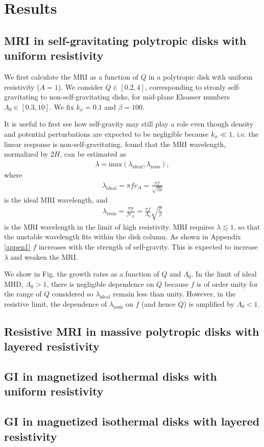 \section{Results}

\subsection{MRI in self-gravitating polytropic disks with uniform
  resistivity}  
We first calculate the MRI as a function of $Q$ in a polytropic disk
with uniform resistivity ($A=1$). We consider $Q\in[0.2,4]$,
corresponding to stronly self-gravitating to non-self-gravitating
disks, for mid-plane Elsasser numbers $\Lambda_0\in[0.3,10]$. We fix $k_x=0.1$ and 
$\beta=100$. 

It is useful to first see how self-gravity may still play a role even
though density and potential perturbations are expected to be
negligible because $k_x\ll1$, i.e. the linear response is
non-self-gravitating. 
\cite{sano99} found that the MRI wavelength, normalized by $2H$, can be estimated as
\begin{align}
  \lambda=\mathrm{max}\left(\lambda_\mathrm{ideal},\lambda_\mathrm{resis}\right), 
\end{align}
where
\begin{align}
  \lambda_\mathrm{ideal} = \pi f v_A = \frac{\pi f}{\sqrt{\beta\rho}} 
\end{align}
is the ideal MRI wavelength, and 
\begin{align}
  \lambda_\mathrm{resis} =\frac{\pi\eta}{f v_A}=\frac{\pi f}{\Lambda_0}\sqrt{\frac{\rho}{\beta}}
\end{align}
is the MRI wavelength in the limit of high resistivity. MRI requires
$\lambda\lesssim 1$, so that the unstable wavelength fits within the
disk column. As shown in Appendix \ref{appen1} $f$ increases with the
strength of self-gravity. This is expected to increase $\lambda$ and
weaken the MRI.  


We show in Fig. the growth rates as a function of $Q$ and
$\Lambda_0$. In the limit of ideal MHD, $\Lambda_0>1$, there is
negligible dependence on $Q$ because $f$ is of order unity for the
range of $Q$ considered so $\lambda_\mathrm{ideal}$ remain less than
  unity. However, in the resistive limit, the dependence of
  $\lambda_\mathrm{resis}$ on $f$ (and hence $Q$) is amplified by
  $\Lambda_0 < 1$.   



\subsection{Resistive MRI in massive polytropic disks with layered
  resistivity} 


\subsection{GI in magnetized isothermal disks with uniform
  resistivity} 


\subsection{GI in magnetized isothermal disks with layered
  resistivity} 
